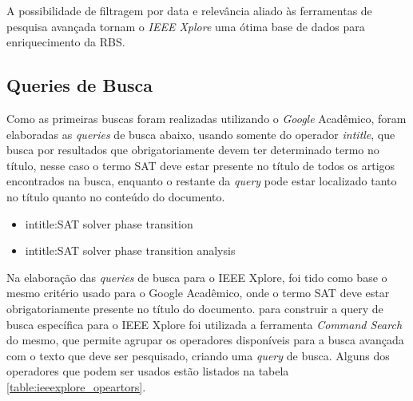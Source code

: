 A possibilidade de filtragem por data e relevância aliado às ferramentas de pesquisa avançada tornam o \textit{IEEE Xplore} uma ótima base de dados para enriquecimento da RBS.

\subsection{Queries de Busca}

Como as primeiras buscas foram realizadas utilizando o \textit{Google} Acadêmico, foram elaboradas as \textit{queries} de busca abaixo, usando somente do operador \textit{intitle}, que busca por resultados que obrigatoriamente devem ter determinado termo no título, nesse caso o termo SAT deve estar presente no título de todos os artigos encontrados na busca, enquanto o restante da \textit{query} pode estar localizado tanto no título quanto no conteúdo do documento.

\begin{itemize}
   \item intitle:SAT solver phase transition
   \item intitle:SAT solver phase transition analysis
\end{itemize} 

Na elaboração das \textit{queries} de busca para o IEEE Xplore, foi tido como base o mesmo critério usado para o Google Acadêmico, onde o termo SAT deve estar obrigatoriamente presente no título do documento. para construir a query de busca específica para o IEEE Xplore foi utilizada a ferramenta \textit{Command Search} do mesmo, que permite agrupar os operadores disponíveis para a busca avançada com o texto que deve ser pesquisado, criando uma \textit{query} de busca. Alguns dos operadores que podem ser usados estão listados na tabela \ref{table:ieeexplore_opeartors}.

